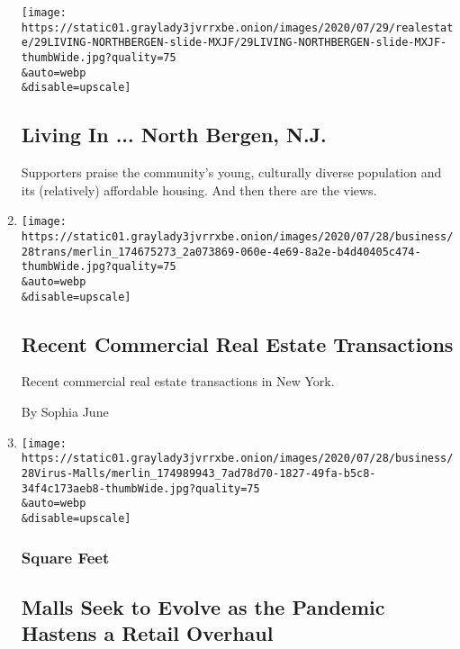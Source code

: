 \begin{enumerate}
  \texttt{[image: https://static01.graylady3jvrrxbe.onion/images/2020/07/29/realestate/29LIVING-NORTHBERGEN-slide-MXJF/29LIVING-NORTHBERGEN-slide-MXJF-thumbWide.jpg?quality=75\\\&auto=webp\\\&disable=upscale]}

  \hypertarget{living-in--north-bergen-nj}{%
  \subsection{Living In ... North Bergen,
  N.J.}\label{living-in--north-bergen-nj}}

  Supporters praise the community's young, culturally diverse population
  and its (relatively) affordable housing. And then there are the views.
\item
  \href{/2020/07/28/business/recent-commercial-real-estate-transactions.html}{}

  \texttt{[image: https://static01.graylady3jvrrxbe.onion/images/2020/07/28/business/28trans/merlin\_174675273\_2a073869-060e-4e69-8a2e-b4d40405c474-thumbWide.jpg?quality=75\\\&auto=webp\\\&disable=upscale]}

  \hypertarget{recent-commercial-real-estate-transactions}{%
  \subsection{Recent Commercial Real Estate
  Transactions}\label{recent-commercial-real-estate-transactions}}

  Recent commercial real estate transactions in New York.

  By Sophia June
\item
  \href{/2020/07/28/business/malls-coronavirus.html}{}

  \texttt{[image: https://static01.graylady3jvrrxbe.onion/images/2020/07/28/business/28Virus-Malls/merlin\_174989943\_7ad78d70-1827-49fa-b5c8-34f4c173aeb8-thumbWide.jpg?quality=75\\\&auto=webp\\\&disable=upscale]}

  \hypertarget{square-feet}{%
  \subsubsection{Square Feet}\label{square-feet}}

  \hypertarget{malls-seek-to-evolve-as-the-pandemic-hastens-a-retail-overhaul}{%
  \subsection{Malls Seek to Evolve as the Pandemic Hastens a Retail
  Overhaul}\label{malls-seek-to-evolve-as-the-pandemic-hastens-a-retail-overhaul}}


\end{enumerate}
